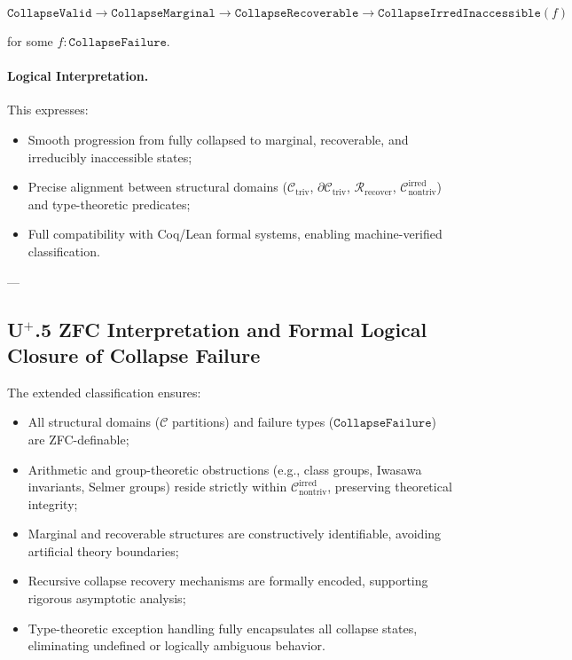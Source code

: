 \documentclass[11pt]{article}
\begin{document}
\[
\texttt{CollapseValid} \to \texttt{CollapseMarginal} \to \texttt{CollapseRecoverable} \to \texttt{CollapseIrredInaccessible}(f)
\]

for some $f : \texttt{CollapseFailure}$.

\paragraph{Logical Interpretation.}

This expresses:

\begin{itemize}
    \item Smooth progression from fully collapsed to marginal, recoverable, and irreducibly inaccessible states;
    \item Precise alignment between structural domains ($\mathcal{C}_{\mathrm{triv}}$, $\partial \mathcal{C}_{\mathrm{triv}}$, $\mathcal{R}_{\mathrm{recover}}$, $\mathcal{C}_{\mathrm{nontriv}}^{\mathrm{irred}}$) and type-theoretic predicates;
    \item Full compatibility with Coq/Lean formal systems, enabling machine-verified classification.
\end{itemize}

---

\subsection*{U$^{+}$.5 ZFC Interpretation and Formal Logical Closure of Collapse Failure}

The extended classification ensures:

\begin{itemize}
    \item All structural domains ($\mathcal{C}$ partitions) and failure types ($\texttt{CollapseFailure}$) are ZFC-definable;
    \item Arithmetic and group-theoretic obstructions (e.g., class groups, Iwasawa invariants, Selmer groups) reside strictly within $\mathcal{C}_{\mathrm{nontriv}}^{\mathrm{irred}}$, preserving theoretical integrity;
    \item Marginal and recoverable structures are constructively identifiable, avoiding artificial theory boundaries;
    \item Recursive collapse recovery mechanisms are formally encoded, supporting rigorous asymptotic analysis;
    \item Type-theoretic exception handling fully encapsulates all collapse states, eliminating undefined or logically ambiguous behavior.
\end{itemize}
\end{document}
